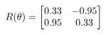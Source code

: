 \documentclass[preview]{standalone}
\begin{document}
\begin{align*}
\special{dvisvgm:raw <g id='unique000'>}R(\theta) = \begin{bmatrix}0.33 & -0.95\\0.95 & 0.33\end{bmatrix}\special{dvisvgm:raw </g>}
\end{align*}
\end{document}
